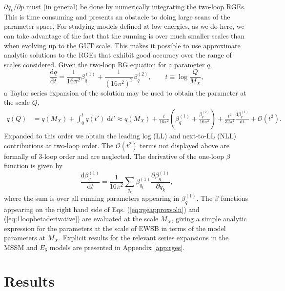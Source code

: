 \documentclass[preprint,amsmath,amssymb,aps,superscriptaddress,prd,showpacs,floatfix,nofootinbib]{revtex4-1}
\begin{document}
$\partial q_k/\partial p$ must (in general) be done by numerically
integrating the two-loop RGEs. This is time consuming and presents an
obstacle to doing large scans of the parameter space. For studying
models defined at low energies, as we do here, we can take advantage
of the fact that the running is over much smaller scales than when
evolving up to the GUT scale. This makes it possible to use
approximate analytic solutions to the RGEs that exhibit good accuracy
over the range of scales considered. Given the two-loop RG equation
for a parameter $q$,
\begin{equation}\label{eq:rge}
\frac{\textrm{d}q}{\mathrm{d}t}=\frac{1}{16\pi^2}\beta_q^{(1)}+\frac{1}{(16\pi^2)^2}\beta_q^{(2)},\qquad t\equiv \log\frac{Q}{M_X},
\end{equation}
a Taylor series expansion of the solution may be used to obtain the
parameter at the scale $Q$,
\begin{align}\label{eq:rgeapproxsoln}
q(Q)&=q(M_X)+\int_0^t q(t')\;\textrm{d}t'\approx q(M_X)+\frac{t}{16\pi^2}\left ( \beta_q^{(1)}+\frac{\beta_q^{(2)}}{16\pi^2}\right )+\frac{t^2}{32\pi^2}\frac{\textrm{d}\beta_q^{(1)}}{\textrm{d}t}+\mathcal{O}(t^2).
\end{align}
Expanded to this order we obtain the leading log (LL) and next-to-LL
(NLL) contributions at two-loop order. The $\mathcal{O}(t^2)$ terms
not displayed above are formally of 3-loop order and are
neglected. The derivative of the one-loop $\beta$ function is given by
\begin{equation}\label{eq:1loopbetaderivative}
\frac{\textrm{d}\beta_q^{(1)}}{\textrm{d}t}=\frac{1}{16\pi^2}\sum_{q_k}\beta_{q_k}^{(1)}\frac{\partial \beta_q^{(1)}}{\partial q_k},
\end{equation}
where the sum is over all running parameters appearing in
$\beta_q^{(1)}$. The $\beta$ functions appearing on the right hand
side of Eqs. (\ref{eq:rgeapproxsoln}) and
(\ref{eq:1loopbetaderivative}) are evaluated at the scale $M_X$,
giving a simple analytic expression for the parameters at the scale of
EWSB in terms of the model parameters at $M_X$. Explicit results for
the relevant series expansions in the MSSM and $E_6$ models are
presented in Appendix \ref{app:rges}.

\section{\label{sec:results}Results}
\end{document}
